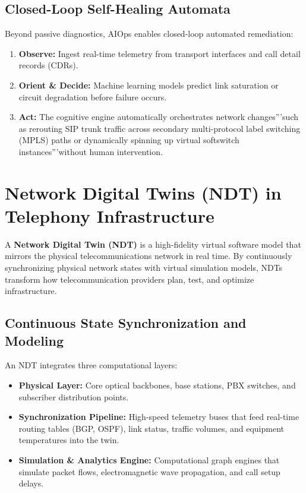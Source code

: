 \documentclass[12pt,a4paper]{report}
\begin{document}
\subsection{Closed-Loop Self-Healing Automata}
Beyond passive diagnostics, AIOps enables closed-loop automated remediation:
\begin{enumerate}
    \item \textbf{Observe:} Ingest real-time telemetry from transport interfaces and call detail records (CDRs).
    \item \textbf{Orient \& Decide:} Machine learning models predict link saturation or circuit degradation before failure occurs.
    \item \textbf{Act:} The cognitive engine automatically orchestrates network changes'''such as rerouting SIP trunk traffic across secondary multi-protocol label switching (MPLS) paths or dynamically spinning up virtual softswitch instances'''without human intervention.
\end{enumerate}

\section{Network Digital Twins (NDT) in Telephony Infrastructure}
A \textbf{Network Digital Twin (NDT)} is a high-fidelity virtual software model that mirrors the physical telecommunications network in real time. By continuously synchronizing physical network states with virtual simulation models, NDTs transform how telecommunication providers plan, test, and optimize infrastructure.

\subsection{Continuous State Synchronization and Modeling}
An NDT integrates three computational layers:
\begin{itemize}
    \item \textbf{Physical Layer:} Core optical backbones, base stations, PBX switches, and subscriber distribution points.
    \item \textbf{Synchronization Pipeline:} High-speed telemetry buses that feed real-time routing tables (BGP, OSPF), link status, traffic volumes, and equipment temperatures into the twin.
    \item \textbf{Simulation \& Analytics Engine:} Computational graph engines that simulate packet flows, electromagnetic wave propagation, and call setup delays.
\end{itemize}
\end{document}
